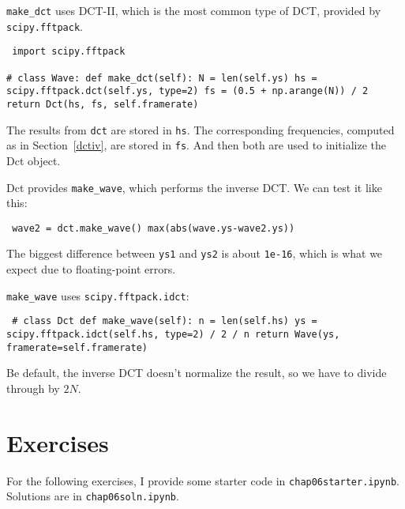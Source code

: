 \documentclass[12pt]{book} \usepackage[width=5.5in,height=8.5in, hmarginratio=3:2,vmarginratio=1:1]{geometry}
\begin{document}
\verb"make_dct" uses DCT-II, which is the most common type of DCT, provided by {\tt scipy.fftpack}. 

\begin{verbatim} import scipy.fftpack 

# class Wave: def make_dct(self): N = len(self.ys) hs = scipy.fftpack.dct(self.ys, type=2) fs = (0.5 + np.arange(N)) / 2 return Dct(hs, fs, self.framerate) \end{verbatim} 

The results from {\tt dct} are stored in {\tt hs}. The corresponding frequencies, computed as in Section~\ref{dctiv}, are stored in {\tt fs}. And then both are used to initialize the Dct object. 

Dct provides \verb"make_wave", which performs the inverse DCT. We can test it like this: 

\begin{verbatim} wave2 = dct.make_wave() max(abs(wave.ys-wave2.ys)) \end{verbatim} 

The biggest difference between {\tt ys1} and {\tt ys2} is about {\tt 1e-16}, which is what we expect due to floating-point errors. 

\verb"make_wave" uses {\tt scipy.fftpack.idct}: 

\begin{verbatim} # class Dct def make_wave(self): n = len(self.hs) ys = scipy.fftpack.idct(self.hs, type=2) / 2 / n return Wave(ys, framerate=self.framerate) \end{verbatim} 

Be default, the inverse DCT doesn't normalize the result, so we have to divide through by $2N$. 

\section{Exercises} 

For the following exercises, I provide some starter code in {\tt chap06starter.ipynb}. Solutions are in {\tt chap06soln.ipynb}. 

\end{document}
